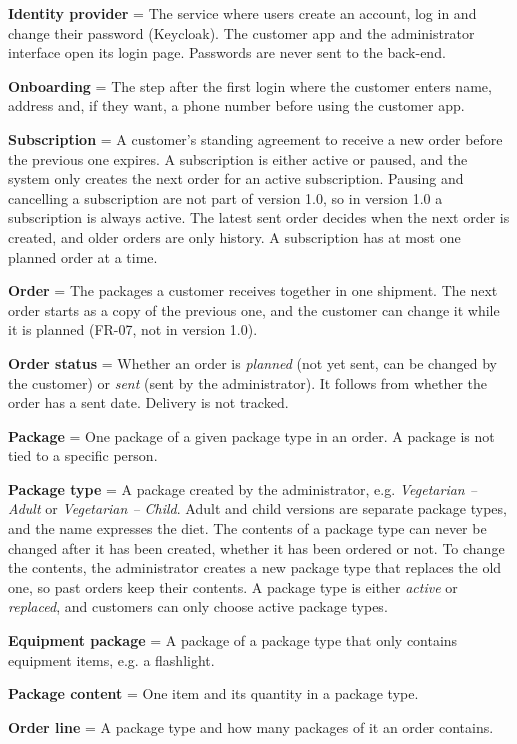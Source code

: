 \documentclass[a4paper,11pt]{article}
\begin{document}
\textbf{Identity provider} = The service where users create an account, log in and change their password (Keycloak). The customer app and the administrator interface open its login page. Passwords are never sent to the back-end.

\textbf{Onboarding} = The step after the first login where the customer enters name, address and, if they want, a phone number before using the customer app.

\textbf{Subscription} = A customer's standing agreement to receive a new order before the previous one expires. A subscription is either active or paused, and the system only creates the next order for an active subscription. Pausing and cancelling a subscription are not part of version 1.0, so in version 1.0 a subscription is always active. The latest sent order decides when the next order is created, and older orders are only history. A subscription has at most one planned order at a time.

\textbf{Order} = The packages a customer receives together in one shipment. The next order starts as a copy of the previous one, and the customer can change it while it is planned (FR-07, not in version 1.0).

\textbf{Order status} = Whether an order is \emph{planned} (not yet sent, can be changed by the customer) or \emph{sent} (sent by the administrator). It follows from whether the order has a sent date. Delivery is not tracked.

\textbf{Package} = One package of a given package type in an order. A package is not tied to a specific person.

\textbf{Package type} = A package created by the administrator, e.g. \emph{Vegetarian -- Adult} or \emph{Vegetarian -- Child}. Adult and child versions are separate package types, and the name expresses the diet. The contents of a package type can never be changed after it has been created, whether it has been ordered or not. To change the contents, the administrator creates a new package type that replaces the old one, so past orders keep their contents. A package type is either \emph{active} or \emph{replaced}, and customers can only choose active package types.

\textbf{Equipment package} = A package of a package type that only contains equipment items, e.g. a flashlight.

\textbf{Package content} = One item and its quantity in a package type.

\textbf{Order line} = A package type and how many packages of it an order contains.
\end{document}
